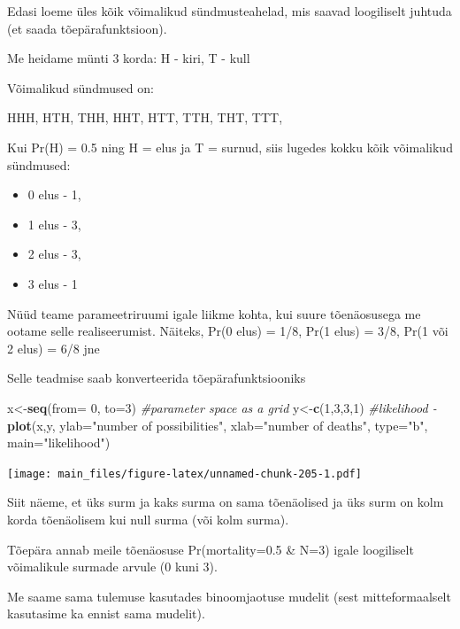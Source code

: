 \documentclass[]{book}
\newenvironment{Shaded}{\begin{snugshade}}{\end{snugshade}}
\newcommand{\KeywordTok}[1]{\textcolor[rgb]{0.13,0.29,0.53}{\textbf{#1}}}
\newcommand{\DataTypeTok}[1]{\textcolor[rgb]{0.13,0.29,0.53}{#1}}
\newcommand{\DecValTok}[1]{\textcolor[rgb]{0.00,0.00,0.81}{#1}}
\newcommand{\StringTok}[1]{\textcolor[rgb]{0.31,0.60,0.02}{#1}}
\newcommand{\CommentTok}[1]{\textcolor[rgb]{0.56,0.35,0.01}{\textit{#1}}}
\newcommand{\NormalTok}[1]{#1}
\providecommand{\tightlist}{%
  \setlength{\itemsep}{0pt}\setlength{\parskip}{0pt}}
\begin{document}
Edasi loeme üles kõik võimalikud sündmusteahelad, mis saavad loogiliselt
juhtuda (et saada tõepärafunktsioon).

Me heidame münti 3 korda: H - kiri, T - kull

Võimalikud sündmused on:

HHH, HTH, THH, HHT, HTT, TTH, THT, TTT,

Kui Pr(H) = 0.5 ning H = elus ja T = surnud, siis lugedes kokku kõik
võimalikud sündmused:

\begin{itemize}
\tightlist
\item
  0 elus - 1,
\item
  1 elus - 3,
\item
  2 elus - 3,
\item
  3 elus - 1
\end{itemize}

Nüüd teame parameetriruumi igale liikme kohta, kui suure tõenäosusega me
ootame selle realiseerumist. Näiteks, Pr(0 elus) = 1/8, Pr(1 elus) =
3/8, Pr(1 või 2 elus) = 6/8 jne

Selle teadmise saab konverteerida tõepärafunktsiooniks

\begin{Shaded}
\begin{Highlighting}[]
\NormalTok{x<-}\KeywordTok{seq}\NormalTok{(}\DataTypeTok{from=} \DecValTok{0}\NormalTok{, }\DataTypeTok{to=}\DecValTok{3}\NormalTok{) }\CommentTok{#parameter space as a grid}
\NormalTok{y<-}\KeywordTok{c}\NormalTok{(}\DecValTok{1}\NormalTok{,}\DecValTok{3}\NormalTok{,}\DecValTok{3}\NormalTok{,}\DecValTok{1}\NormalTok{) }\CommentTok{#likelihood - }
\KeywordTok{plot}\NormalTok{(x,y, }\DataTypeTok{ylab=}\StringTok{"number of possibilities"}\NormalTok{, }\DataTypeTok{xlab=}\StringTok{"number of deaths"}\NormalTok{, }\DataTypeTok{type=}\StringTok{"b"}\NormalTok{, }\DataTypeTok{main=}\StringTok{"likelihood"}\NormalTok{)}
\end{Highlighting}
\end{Shaded}

\texttt{[image: main\_files/figure-latex/unnamed-chunk-205-1.pdf]}

Siit näeme, et üks surm ja kaks surma on sama tõenäolised ja üks surm on
kolm korda tõenäolisem kui null surma (või kolm surma).

Tõepära annab meile tõenäosuse Pr(mortality=0.5 \& N=3) igale
loogiliselt võimalikule surmade arvule (0 kuni 3).

Me saame sama tulemuse kasutades binoomjaotuse mudelit (sest
mitteformaalselt kasutasime ka ennist sama mudelit).
\end{document}
